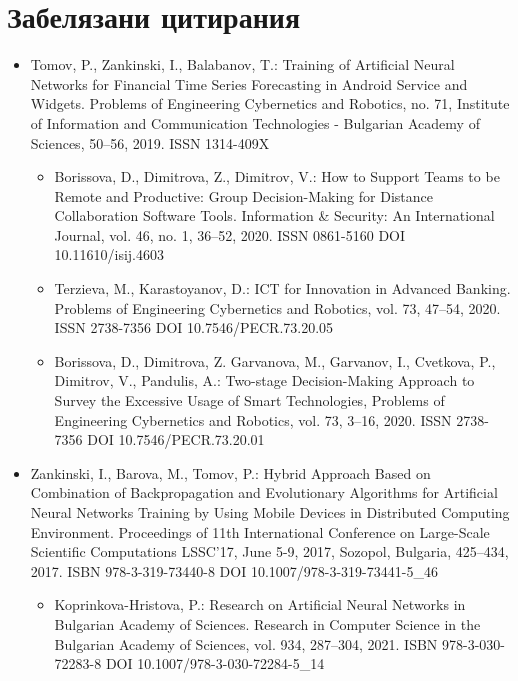 \section*{Забелязани цитирания}

\begin{itemize}
\item Tomov, P., Zankinski, I., Balabanov, T.: Training of Artificial Neural Networks for Financial Time Series Forecasting in Android Service and Widgets. Problems of Engineering Cybernetics and Robotics, no. 71, Institute of Information and Communication Technologies - Bulgarian Academy of Sciences, 50--56, 2019. ISSN 1314-409X
	\begin{itemize}
	\item Borissova, D., Dimitrova, Z., Dimitrov, V.: How to Support Teams to be Remote and Productive: Group Decision-Making for Distance Collaboration Software Tools. Information \& Security: An International Journal, vol. 46, no. 1, 36--52, 2020. ISSN 0861-5160 DOI 10.11610/isij.4603

	\item Terzieva, M., Karastoyanov, D.: ICT for Innovation in Advanced Banking. Problems of Engineering Cybernetics and Robotics, vol. 73, 47--54, 2020. ISSN 2738-7356 DOI 10.7546/PECR.73.20.05

	\item Borissova, D., Dimitrova, Z. Garvanova, M., Garvanov, I., Cvetkova, P., Dimitrov, V., Pandulis, A.: Two-stage Decision-Making Approach to Survey the Excessive Usage of Smart Technologies, Problems of Engineering Cybernetics and Robotics, vol. 73, 3--16, 2020. ISSN 2738-7356 DOI 10.7546/PECR.73.20.01
	\end{itemize}

\item Zankinski, I., Barova, M., Tomov, P.: Hybrid Approach Based on Combination of Backpropagation and Evolutionary Algorithms for Artificial Neural Networks Training by Using Mobile Devices in Distributed Computing Environment. Proceedings of 11th International Conference on Large-Scale Scientific Computations LSSC'17, June 5-9, 2017, Sozopol, Bulgaria, 425--434, 2017. ISBN 978-3-319-73440-8 DOI 10.1007/978-3-319-73441-5\_46
	\begin{itemize}
	\item Koprinkova-Hristova, P.: Research on Artificial Neural Networks in Bulgarian Academy of Sciences. Research in Computer Science in the Bulgarian Academy of Sciences, vol. 934, 287--304, 2021. ISBN 978-3-030-72283-8 DOI 10.1007/978-3-030-72284-5\_14
	\end{itemize}


\end{itemize}
